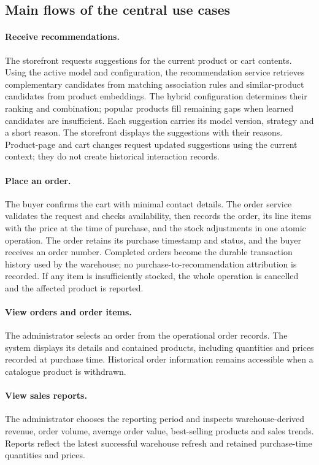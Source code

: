 \documentclass[a4paper,12pt]{article}
\begin{document}
\subsection{Main flows of the central use cases}

\paragraph{Receive recommendations.}
The storefront requests suggestions for the current product or cart contents. Using the active model
and configuration, the recommendation service retrieves complementary candidates from matching
association rules and similar-product candidates from product embeddings. The hybrid configuration
determines their ranking and combination; popular products fill remaining gaps when learned
candidates are insufficient. Each suggestion carries its model version, strategy and a short reason.
The storefront displays the suggestions with their reasons. Product-page and cart changes request
updated suggestions using the current context; they do not create historical interaction records.

\paragraph{Place an order.}
The buyer confirms the cart with minimal contact details. The order service validates the request and
checks availability, then records the order, its line items with the price at the time of purchase,
and the stock adjustments in one atomic operation. The order retains its purchase timestamp and
status, and the buyer receives an order number. Completed orders become the durable transaction
history used by the warehouse; no purchase-to-recommendation attribution is recorded. If any item is
insufficiently stocked, the whole operation is cancelled and the
affected product is reported.

\paragraph{View orders and order items.}
The administrator selects an order from the operational order records. The system displays its
details and contained products, including quantities and prices recorded at purchase time.
Historical order information remains accessible when a catalogue product is withdrawn.

\paragraph{View sales reports.}
The administrator chooses the reporting period and inspects warehouse-derived revenue, order volume,
average order value, best-selling products and sales trends. Reports reflect the latest successful
warehouse refresh and retained purchase-time quantities and prices.
\end{document}
